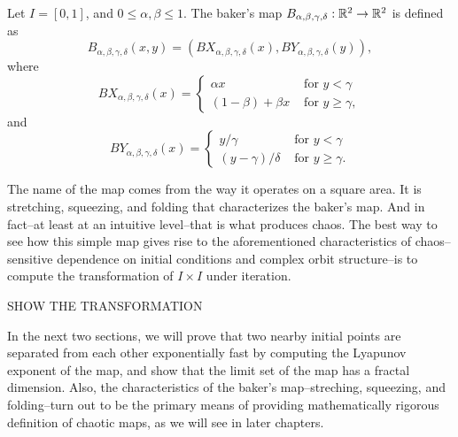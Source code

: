 \documentclass[12pt,twoside]{book}
\begin{document}
\begin{definition}
  Let $I = [0,1]$, and $0 \leq \alpha, \beta \leq 1$.
  The baker's map $B_{\alpha, \beta, \gamma, \delta}: \mathbb{R}^2 \to \mathbb{R}^2$ is defined as
  \begin{equation*}
    B_{\alpha, \beta, \gamma, \delta}(x,y) = (BX_{\alpha, \beta, \gamma, \delta}(x), BY_{\alpha, \beta, \gamma, \delta}(y)),
  \end{equation*}
  where
  \begin{equation*}
    BX_{\alpha, \beta, \gamma, \delta}(x) =
     \begin{cases}
      \alpha x  &\mbox{ for } y < \gamma \\
      (1 - \beta) + \beta x  &\mbox{ for } y \geq \gamma,
    \end{cases}
  \end{equation*}
  and
  \begin{equation*}
    BY_{\alpha, \beta, \gamma, \delta}(x) =
     \begin{cases}
       y/\gamma  &\mbox{ for } y < \gamma \\
       (y - \gamma)/ \delta  &\mbox{ for } y \geq \gamma.
    \end{cases}
  \end{equation*}

  \label{defn:baker}
\end{definition}

The name of the map comes from the way it operates on a square area.
It is stretching, squeezing, and folding that characterizes the baker's map.
And in fact--at least at an intuitive level--that is what produces chaos.
The best way to see how this simple map gives rise to the aforementioned characteristics of chaos--sensitive dependence on initial conditions and complex orbit structure--is to compute the transformation of $I \times I$ under iteration.

SHOW THE TRANSFORMATION

In the next two sections, we will prove that two nearby initial points are separated from each other exponentially fast by computing the Lyapunov exponent of the map, and show that the limit set of the map has a fractal dimension.
Also, the characteristics of the baker's map--streching, squeezing, and folding--turn out to be the primary means of providing mathematically rigorous definition of chaotic maps, as we will see in later chapters.
\end{document}
